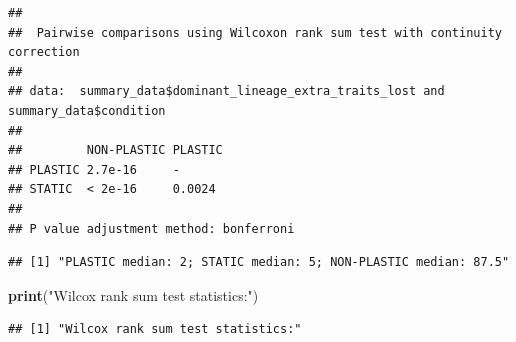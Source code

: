 \documentclass[]{book}
\newenvironment{Shaded}{\begin{snugshade}}{\end{snugshade}}
\newcommand{\DataTypeTok}[1]{\textcolor[rgb]{0.13,0.29,0.53}{#1}}
\newcommand{\KeywordTok}[1]{\textcolor[rgb]{0.13,0.29,0.53}{\textbf{#1}}}
\newcommand{\NormalTok}[1]{#1}
\newcommand{\OperatorTok}[1]{\textcolor[rgb]{0.81,0.36,0.00}{\textbf{#1}}}
\newcommand{\StringTok}[1]{\textcolor[rgb]{0.31,0.60,0.02}{#1}}
\begin{document}
\begin{verbatim}
## 
##  Pairwise comparisons using Wilcoxon rank sum test with continuity correction 
## 
## data:  summary_data$dominant_lineage_extra_traits_lost and summary_data$condition 
## 
##         NON-PLASTIC PLASTIC
## PLASTIC 2.7e-16     -      
## STATIC  < 2e-16     0.0024 
## 
## P value adjustment method: bonferroni
\end{verbatim}

\begin{Shaded}
\end{Shaded}

\begin{verbatim}
## [1] "PLASTIC median: 2; STATIC median: 5; NON-PLASTIC median: 87.5"
\end{verbatim}

\begin{Shaded}
\begin{Highlighting}[]
\KeywordTok{print}\NormalTok{(}\StringTok{"Wilcox rank sum test statistics:"}\NormalTok{)}
\end{Highlighting}
\end{Shaded}

\begin{verbatim}
## [1] "Wilcox rank sum test statistics:"
\end{verbatim}
\end{document}
